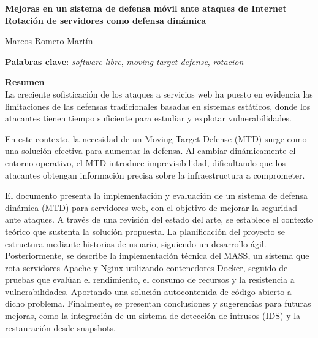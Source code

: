 \thispagestyle{empty}

\begin{center}
{\large\bfseries Mejoras en un sistema de defensa móvil ante ataques de Internet \\ Rotación de servidores como defensa dinámica }\\
\end{center}
\begin{center}
	Marcos Romero Martín\\
\end{center}


\vspace{0.5cm}
\noindent\textbf{Palabras clave}: \textit{software libre}, \textit{moving target defense},  \textit{rotacion}
\vspace{0.7cm}

\noindent\textbf{Resumen}\\
	
La creciente sofisticación de los ataques a servicios web ha puesto en evidencia las limitaciones de las defensas tradicionales basadas en sistemas estáticos, donde los atacantes tienen tiempo suficiente para estudiar y explotar vulnerabilidades.

En este contexto, la necesidad de un Moving Target Defense (MTD) surge como una solución efectiva para aumentar la defensa. Al cambiar dinámicamente el entorno operativo, el MTD introduce imprevisibilidad, dificultando que los atacantes obtengan información precisa sobre la infraestructura a comprometer.

El documento presenta la implementación y evaluación de un sistema de defensa dinámica (MTD) para servidores web, con el objetivo de mejorar la seguridad ante ataques. A través de una revisión del estado del arte, se establece el contexto teórico que sustenta la solución propuesta. La planificación del proyecto se estructura mediante historias de usuario, siguiendo un desarrollo ágil. Posteriormente, se describe la implementación técnica del MASS, un sistema que rota servidores Apache y Nginx utilizando contenedores Docker, seguido de pruebas que evalúan el rendimiento, el consumo de recursos y la resistencia a vulnerabilidades. Aportando una solución autocontenida de código abierto a dicho problema. Finalmente, se presentan conclusiones y sugerencias para futuras mejoras, como la integración de un sistema de detección de intrusos (IDS) y la restauración desde snapshots.


